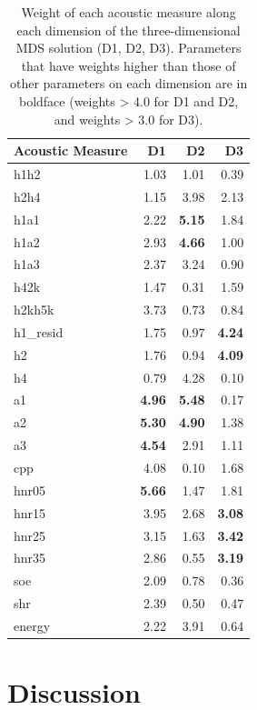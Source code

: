 \begin{table}[ht]
    \centering
    \caption{Weight of each acoustic measure along each dimension of the three-dimensional MDS solution (D1, D2, D3). Parameters that have weights higher than those of other parameters on each dimension are in boldface (weights > 4.0 for D1 and D2, and weights > 3.0 for D3).} 
    \label{tab:acoustic_correlates}
    \begin{tabular}{lrrr}
    \hline
    Acoustic Measure & D1 & D2 & D3 \\ 
    \hline
    h1h2 & 1.03 & 1.01 & 0.39 \\ 
    h2h4 & 1.15 & 3.98 & 2.13 \\ 
    h1a1 & 2.22 & \textbf{5.15} & 1.84 \\ 
    h1a2 & 2.93 & \textbf{4.66} & 1.00 \\ 
    h1a3 & 2.37 & 3.24 & 0.90 \\ 
    h42k & 1.47 & 0.31 & 1.59 \\ 
    h2kh5k & 3.73 & 0.73 & 0.84 \\ 
    h1\_resid & 1.75 & 0.97 & \textbf{4.24} \\ 
    h2 & 1.76 & 0.94 & \textbf{4.09} \\ 
    h4 & 0.79 & 4.28 & 0.10 \\ 
    a1 & \textbf{4.96} & \textbf{5.48} & 0.17 \\ 
    a2 & \textbf{5.30} & \textbf{4.90} & 1.38 \\ 
    a3 & \textbf{4.54} & 2.91 & 1.11 \\ 
    cpp & 4.08 & 0.10 & 1.68 \\ 
    hnr05 & \textbf{5.66} & 1.47 & 1.81 \\ 
    hnr15 & 3.95 & 2.68 & \textbf{3.08} \\ 
    hnr25 & 3.15 & 1.63 & \textbf{3.42} \\ 
    hnr35 & 2.86 & 0.55 & \textbf{3.19} \\ 
    soe & 2.09 & 0.78 & 0.36 \\ 
    shr & 2.39 & 0.50 & 0.47 \\ 
    energy & 2.22 & 3.91 & 0.64 \\ 
    \hline
    \end{tabular}
\end{table}

\section{Discussion} \label{sec:acousticlandscape:discussion}

